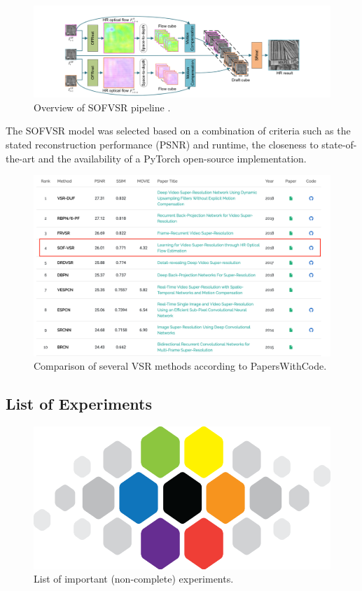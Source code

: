 \begin{figure}[!ht]
	\centering
	\includegraphics[width=14cm]{figures/sofvsr}
	\caption{Overview of SOFVSR pipeline \cite{LFVSRTHROFE}.}
  \label{fig:sofvsr}
\end{figure}

The SOFVSR model was selected based on a combination of criteria such as the
stated reconstruction performance (PSNR) and runtime, the closeness to
state-of-the-art and the availability of a PyTorch open-source implementation.

\begin{figure}[!ht]
	\centering
	\includegraphics[width=14cm]{figures/sofvsr_selection}
	\caption{Comparison of several \ac{VSR} methods according to PapersWithCode.}
  \label{fig:sofvsr_selection}
\end{figure}

\subsection*{List of Experiments}

\begin{figure}[!ht]
	\centering
	\includegraphics[width=14cm]{figures/cvl}
	\caption{List of important (non-complete) experiments.}
  \label{fig:experiments}
\end{figure}
